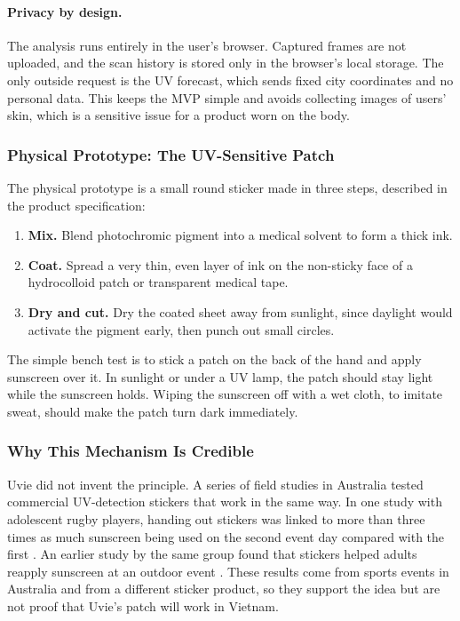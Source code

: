 \paragraph{Privacy by design.} The analysis runs entirely in the user's browser.
Captured frames are not uploaded, and the scan history is stored only in the
browser's local storage. The only outside request is the UV forecast, which sends fixed city
coordinates and no personal data. This keeps the MVP simple and avoids collecting images of
users' skin, which is a sensitive issue for a product worn on the body.

\subsubsection{Physical Prototype: The UV-Sensitive Patch}
The physical prototype is a small round sticker made in three steps, described in
the product specification:
\begin{enumerate}[itemsep=0pt]
  \item \textbf{Mix.} Blend photochromic pigment into a medical solvent to form a
    thick ink.
  \item \textbf{Coat.} Spread a very thin, even layer of ink on the non-sticky face
    of a hydrocolloid patch or transparent medical tape.
  \item \textbf{Dry and cut.} Dry the coated sheet away from sunlight, since
    daylight would activate the pigment early, then punch out small circles.
\end{enumerate}
The simple bench test is to stick a patch on the back of the hand and apply
sunscreen over it. In sunlight or under a UV lamp, the patch should stay light
while the sunscreen holds. Wiping the sunscreen off with a wet cloth, to imitate
sweat, should make the patch turn dark immediately.


\subsubsection{Why This Mechanism Is Credible}
Uvie did not invent the principle. A series of field studies in Australia tested
commercial UV-detection stickers that work in the same way. In one study with
adolescent rugby players, handing out stickers was linked to more than three times
as much sunscreen being used on the second event day compared with the first
\cite{horsham2020}. An earlier study by the same group found that stickers helped
adults reapply sunscreen at an outdoor event \cite{hacker2019}. These results come
from sports events in Australia and from a different sticker product, so they
support the idea but are not proof that Uvie's patch will work in Vietnam.


